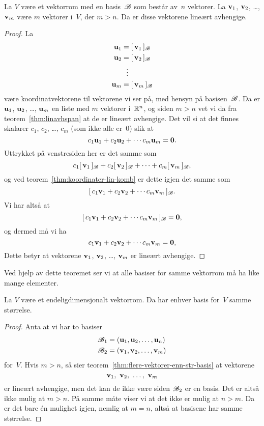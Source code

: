 \begin{thm}
\label{thm:flere-vektorer-enn-str-basis}
La $V$ være et vektorrom med en basis~$\mathscr{B}$ som består av~$n$ vektorer.
La $\mathbf{v}_1$, $\mathbf{v}_2$, \ldots, $\mathbf{v}_m$ være $m$ vektorer i~$V$, der $m > n$.
Da er disse vektorene lineært avhengige.
\end{thm}
\begin{proof}
La
\begin{align*}
\mathbf{u}_1 &= [\,{\mathbf{v}_1}\,]_{\mathscr{B}} \\
\mathbf{u}_2 &= [\,{\mathbf{v}_2}\,]_{\mathscr{B}} \\
     &\ \ \vdots \\
\mathbf{u}_m &= [\,{\mathbf{v}_m}\,]_{\mathscr{B}}
\end{align*}
være koordinatvektorene til vektorene vi ser på, med hensyn på
basisen~$\mathscr{B}$.  Da er $\mathbf{u}_1$, $\mathbf{u}_2$, \ldots, $\mathbf{u}_m$ en liste med $m$
vektorer i~$\mathbb{R}^n$, og siden $m > n$ vet vi da fra
teorem~\ref{thm:linavhspan} at de er lineært avhengige.  Det vil si at
det finnes skalarer $c_1$, $c_2$, \ldots, $c_m$ (som ikke alle er~$0$)
slik at
\[
c_1 \mathbf{u}_1 + c_2 \mathbf{u}_2 + \cdots c_m \mathbf{u}_m = \mathbf{0}.
\]
Uttrykket på venstresiden her er det samme som
\[
c_1 [\,{\mathbf{v}_1}\,]_{\mathscr{B}} + c_2 [\,{\mathbf{v}_2}\,]_{\mathscr{B}} + \cdots + c_m [\,{\mathbf{v}_m}\,]_{\mathscr{B}},
\]
og ved teorem~\ref{thm:koordinater-lin-komb} er dette igjen det samme
som
\[
[\,{c_1 \mathbf{v}_1 + c_2 \mathbf{v}_2 + \cdots c_m \mathbf{v}_m}\,]_{\mathscr{B}}.
\]
Vi har altså at
\[
[\,{c_1 \mathbf{v}_1 + c_2 \mathbf{v}_2 + \cdots c_m \mathbf{v}_m}\,]_{\mathscr{B}} = \mathbf{0},
\]
og dermed må vi ha
\[
c_1 \mathbf{v}_1 + c_2 \mathbf{v}_2 + \cdots c_m \mathbf{v}_m = \mathbf{0},
\]
Dette betyr at vektorene $\mathbf{v}_1$, $\mathbf{v}_2$, \ldots, $\mathbf{v}_m$ er lineært
avhengige.
\end{proof}

Ved hjelp av dette teoremet ser vi at alle basiser for samme vektorrom
må ha like mange elementer.

\begin{thm}
\label{thm:basis-str-invariant}
La $V$ være et endeligdimensjonalt vektorrom.  Da har enhver basis
for~$V$ samme størrelse.
\end{thm}
\begin{proof}
Anta at vi har to basiser
\begin{align*}
\mathscr{B}_1 &= (\mathbf{u}_1, \mathbf{u}_2, \ldots, \mathbf{u}_n) \\
\mathscr{B}_2 &= (\mathbf{v}_1, \mathbf{v}_2, \ldots, \mathbf{v}_m)
\end{align*}
for~$V$.  Hvis $m > n$, så sier
teorem~\ref{thm:flere-vektorer-enn-str-basis} at vektorene
\[
\v_1,\ \v_2,\ \ldots,\ \v_m
\]
er lineært avhengige, men det kan de ikke være siden $\mathscr{B}_2$ er en
basis.  Det er altså ikke mulig at $m > n$.  På samme måte viser vi at
det ikke er mulig at $n > m$.  Da er det bare én mulighet igjen,
nemlig at $m = n$, altså at basisene har samme størrelse.
\end{proof}

